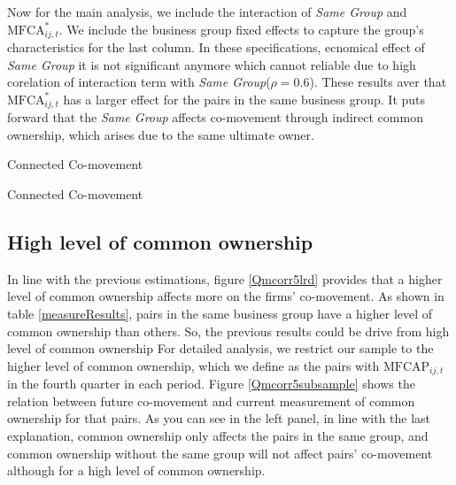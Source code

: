 	
	Now for the main analysis, we include the interaction of \textit{Same Group} and $\text{MFCA}^*_{ij,t}$. We include the business group fixed effects to capture the group's characteristics for the last column. In these specifications, ecnomical effect of \textit{Same Group} it is not significant anymore which  cannot reliable due to high corelation of interaction term with \textit{Same Group}($\rho = 0.6$). These results aver that $\text{MFCA}^*_{ij,t}$ has a larger effect for the pairs in the same business group. It puts forward that the \textit{Same Group}  affects co-movement through indirect common ownership, which arises due to the same ultimate owner. 
	
	
	


{\begin{table}[p]
		\centering
		\caption{Connected Co-movement}
		\label{mresult2part1}
		\resizebox{1\textwidth}{!}{
			
				{}
			
		}
\end{table}}

{\begin{table}[p]
		\centering
		\caption{Connected Co-movement}
		\label{mresult2part2}
		\resizebox{1\textwidth}{!}{
			
				{}
			
		}
\end{table}}


		\FloatBarrier
		
		
		
		\subsection{{High level of common ownership}}
		
			In line with the previous estimations, figure \ref{Qmcorr5lrd} provides that a higher level of common ownership affects more on the firms' co-movement. As shown in table \ref{measureResults}, pairs in the same business group have a higher level of common ownership than others. So, the previous results could be drive from high level of common ownership For detailed analysis, we restrict our sample to the higher level of common ownership, which we define as the pairs with $\text{MFCAP}_{ij,t}$ in the fourth quarter in each period. Figure \ref{Qmcorr5subsample} shows the relation between future co-movement and current measurement of common ownership for that pairs. As you can see in the left panel, in line with the last explanation, common ownership only affects the pairs in the same group, and common ownership without the same group will not affect pairs' co-movement although for a high level of common ownership.
			
